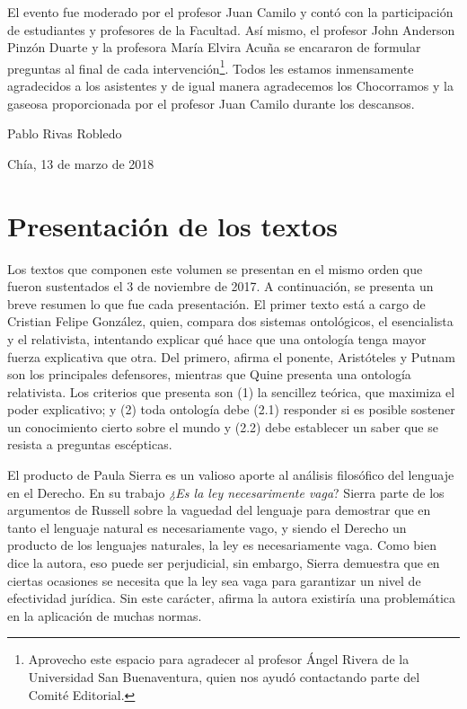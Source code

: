 \documentclass[]{book}
\begin{document}
El evento fue moderado por el profesor Juan Camilo y contó con la
participación de estudiantes y profesores de la Facultad. Así mismo, el
profesor John Anderson Pinzón Duarte y la profesora María Elvira Acuña
se encararon de formular preguntas al final de cada
intervención\footnote{Aprovecho este espacio para agradecer al profesor
  Ángel Rivera de la Universidad San Buenaventura, quien nos ayudó
  contactando parte del Comité Editorial.}. Todos les estamos
inmensamente agradecidos a los asistentes y de igual manera agradecemos
los Chocorramos y la gaseosa proporcionada por el profesor Juan Camilo
durante los descansos.

\begin{flushright}
	Pablo Rivas Robledo

Chía, 13 de marzo de 2018
\end{flushright}

\chapter{\texorpdfstring{\textbf{Presentación de los
textos}}{Presentación de los textos}}\label{presentaciuxf3n-de-los-textos.}

Los textos que componen este volumen se presentan en el mismo orden que
fueron sustentados el 3 de noviembre de 2017. A continuación, se
presenta un breve resumen lo que fue cada presentación. El primer texto
está a cargo de Cristian Felipe González, quien, compara dos sistemas
ontológicos, el esencialista y el relativista, intentando explicar qué
hace que una ontología tenga mayor fuerza explicativa que otra. Del
primero, afirma el ponente, Aristóteles y Putnam son los principales
defensores, mientras que Quine presenta una ontología relativista. Los
criterios que presenta son (1) la sencillez teórica, que maximiza el
poder explicativo; y (2) toda ontología debe (2.1) responder si es
posible sostener un conocimiento cierto sobre el mundo y (2.2) debe
establecer un saber que se resista a preguntas escépticas.

El producto de Paula Sierra es un valioso aporte al análisis filosófico
del lenguaje en el Derecho. En su trabajo \emph{¿Es la ley necesarimente
vaga}? Sierra parte de los argumentos de Russell sobre la vaguedad del
lenguaje para demostrar que en tanto el lenguaje natural es
necesariamente vago, y siendo el Derecho un producto de los lenguajes
naturales, la ley es necesariamente vaga. Como bien dice la autora, eso
puede ser perjudicial, sin embargo, Sierra demuestra que en ciertas
ocasiones se necesita que la ley sea vaga para garantizar un nivel de
efectividad jurídica. Sin este carácter, afirma la autora existiría una
problemática en la aplicación de muchas normas.
\end{document}
